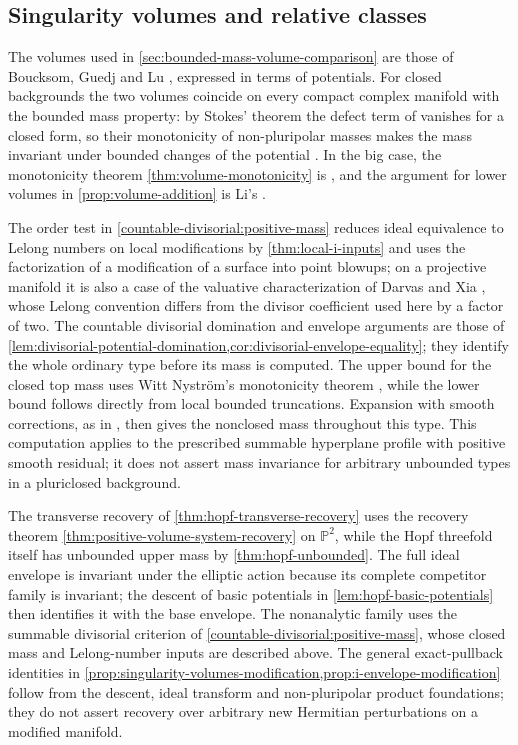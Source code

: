 \subsection{Singularity volumes and relative classes}

The volumes used in \cref{sec:bounded-mass-volume-comparison} are those of Boucksom, Guedj and Lu \cite[Definition 3.1]{BGL25}, expressed in terms of potentials. For closed backgrounds the two volumes coincide on every compact complex manifold with the bounded mass property: by Stokes' theorem the defect term of \cite[(2.7)]{BGL25} vanishes for a closed form, so their monotonicity of non-pluripolar masses \cite[Theorem~2.8]{BGL25} makes the mass invariant under bounded changes of the potential \cite[Example~3.2]{BGL25}. In the big case, the monotonicity theorem \cref{thm:volume-monotonicity} is \cite[Proposition 3.7]{BGL25}, and the argument for lower volumes in \cref{prop:volume-addition} is Li's \cite[v1, Proposition 2.5]{XL26}.

The order test in \cref{countable-divisorial:positive-mass} reduces ideal equivalence to Lelong numbers on local modifications by \cref{thm:local-i-inputs} and uses the factorization of a modification of a surface into point blowups; on a projective manifold it is also a case of the valuative characterization of Darvas and Xia \cite[Theorem~2.13 and Proposition~2.30]{DX22}, whose Lelong convention differs from the divisor coefficient used here by a factor of two. The countable divisorial domination and envelope arguments are those of \cref{lem:divisorial-potential-domination,cor:divisorial-envelope-equality}; they identify the whole ordinary type before its mass is computed. The upper bound for the closed top mass uses Witt Nystr\"om's monotonicity theorem \cite[Theorem~1.2]{WN19}, while the lower bound follows directly from local bounded truncations. Expansion with smooth corrections, as in \cite[Section~2.1]{BGL25}, then gives the nonclosed mass throughout this type. This computation applies to the prescribed summable hyperplane profile with positive smooth residual; it does not assert mass invariance for arbitrary unbounded types in a pluriclosed background.

The transverse recovery of \cref{thm:hopf-transverse-recovery} uses the recovery theorem \cref{thm:positive-volume-system-recovery} on $\mathbb P^2$, while the Hopf threefold itself has unbounded upper mass by \cref{thm:hopf-unbounded}. The full ideal envelope is invariant under the elliptic action because its complete competitor family is invariant; the descent of basic potentials in \cref{lem:hopf-basic-potentials} then identifies it with the base envelope. The nonanalytic family uses the summable divisorial criterion of \cref{countable-divisorial:positive-mass}, whose closed mass and Lelong-number inputs are described above. The general exact-pullback identities in \cref{prop:singularity-volumes-modification,prop:i-envelope-modification} follow from the descent, ideal transform and non-pluripolar product foundations; they do not assert recovery over arbitrary new Hermitian perturbations on a modified manifold.

